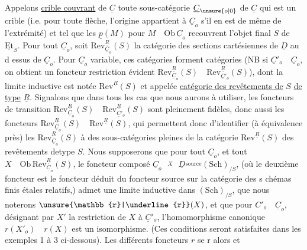 Appelons \uline{crible couvrant} de $\underline{C}$ toute sous-catégorie  $\underline{C}_{\unsure{o|0}}$ de $\underline{C}$ qui est un crible (i.e. pour toute flèche, l'origine appartient à $\underline{C}_o$ s'il en est de même de l'extrémité) et tel que les $\underline{p}(M)$ pour $M\quad\mathrm{Ob}\,\underline{C}_o$ recouvrent l'objet final $S$ de $\underline{\mathrm{Et}}_S$. Pour tout $\underline{C}_o$, soit $\mathrm{Rev}^{\underline{R}}_{\underline{C}_o}(S)$ la catégorie des sections cartésiennes de $\underline{D}$ au d essus de $\underline{C}_o$. Pour $\underline{C}_o$ variable, ces catégories forment  catégories (NB si $\underline{C}'_o\quad\underline{C}_o$, on obtient un foncteur restriction évident $\mathrm{Rev}^{\underline{R}}_{\underline{C}_o}(S)\quad\mathrm{Rev}^{\underline{R}}_{\underline{C}'_o}(S)$),  dont la limite inductive est notée $\mathrm{Rev}^{\underline{R}}(S)$ et appelée \uline{catégorie des revêtements de} $S$ \uline{de type} $\underline{R}$. Signalons que dans tous les cas que nous aurons à utiliser, les foncteurs de transition $\mathrm{Rev}^{\underline{R}}_{\underline{C}_o}(S)\quad\mathrm{Rev}^{\underline{R}}_{\underline{C}'_o}(S)$ sont pleinement fidèles, donc aussi les foncteurs $\mathrm{Rev}^{\underline{R}}_{\underline{C}_o}(S)\quad\mathrm{Rev}^{\underline{R}}(S)$, qui permettent donc d'identifier (à équivalence près) les $\mathrm{Rev}^{\underline{R}}_{\underline{C}_o}(S)$ à des sous-catégories pleines de la catégorie $\mathrm{Rev}^{\underline{R}}(S)$ des revêtements detype $S$. Nous supposerons  que pour tout $\underline{C}_o$,  et tout $X\quad\mathrm{Ob}\,\mathrm{Rev}^{\underline{R}}_{\underline{C}_o}(S)$, le foncteur composé $\underline{C}_o\overset{X}{\qquad}\underline{D}\overset{\mathrm{source}}{\qquad}(\mathrm{Sch})_{/S}$, (où le deuxième foncteur est le foncteur déduit du foncteur source sur la catégorie des s chémas finis étales relatifs,) admet une limite inductive dans $(\mathrm{Sch})_{/S}$, que nous noterons $\unsure{\mathbb{r}|\underline{r}}(X)$, et que pour $C'_o\quad\underline{C}_o$, désignant par $X'$ la restriction de $X$ à $\underline{C}'_o$, l'homomorphisme canonique $r(X'_o)\quad r(X)$ est un isomorphisme. (Ces conditions seront satisfaites dans les exemples  1 à 3 ci-dessous). Les différents foncteurs $r$ se r  alors et
